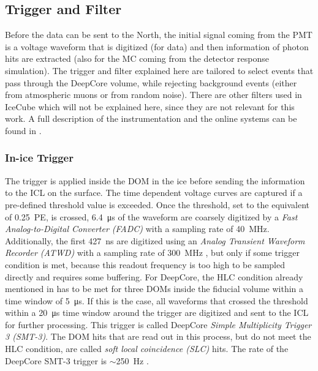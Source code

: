 \subsection{Trigger and Filter} 

Before the data can be sent to the North, the initial signal coming from the PMT is a voltage waveform that is digitized (for data) and then information of photon hits are extracted (also for the MC coming from the detector response simulation). The trigger and filter explained here are tailored to select events that pass through the DeepCore volume, while rejecting background events (either from atmospheric muons or from random noise). There are other filters used in IceCube which will not be explained here, since they are not relevant for this work. A full description of the instrumentation and the online systems can be found in .


\subsubsection{In-ice Trigger} 

The trigger is applied inside the DOM in the ice before sending the information to the ICL on the surface. The time dependent voltage curves are captured if a pre-defined threshold value is exceeded. Once the threshold, set to the equivalent of \SI{0.25}{PE}, is crossed, \SI{6.4}{\micro\second} of the waveform are coarsely digitized by a \textit{Fast Analog-to-Digital Converter (FADC)} with a sampling rate of \SI{40}{\mega\hertz}. Additionally, the first \SI{427}{\nano\second} are digitized using an \textit{Analog Transient Waveform Recorder (ATWD)} with a sampling rate of \SI{300}{\mega\hertz} , but only if some trigger condition is met, because this readout frequency is too high to be sampled directly and requires some buffering. For DeepCore, the HLC condition already mentioned in  has to be met for three DOMs inside the fiducial volume within a time window of \SI{5}{\micro\second}. If this is the case, all waveforms that crossed the threshold within a \SI{20}{\micro\second} time window around the trigger are digitized and sent to the ICL for further processing. This trigger is called DeepCore \textit{Simple Multiplicity Trigger 3 (SMT-3)}. The DOM hits that are read out in this process, but do not meet the HLC condition, are called \textit{soft local coincidence (SLC)} hits. The rate of the DeepCore SMT-3 trigger is $\sim$\SI{250}{\hertz} .


